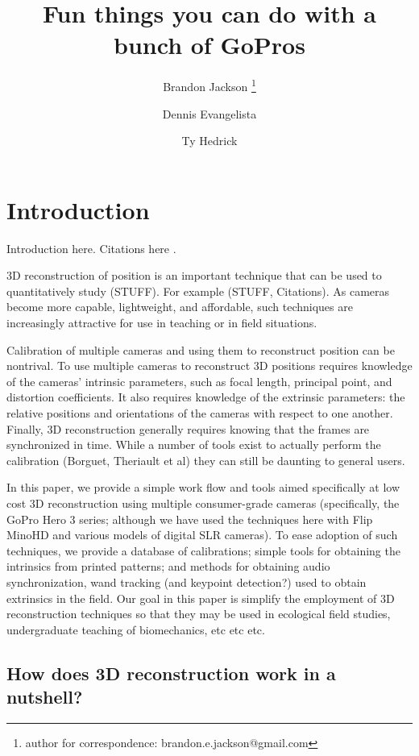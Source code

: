 \documentclass[fleqn,10pt]{wlpeerj}
\title{Fun things you can do with a bunch of GoPros}
\author[1,2]{Brandon Jackson \thanks{author for correspondence: brandon.e.jackson@gmail.com}}
\author[2]{Dennis Evangelista}
\author[2]{Ty Hedrick}
\affil[1]{Longwood College, Charlottesville, VA}
\affil[2]{University of North Carolina at Chapel Hill, NC 27599-3280, USA}
\begin{document}
\flushbottom
\maketitle
\thispagestyle{empty}

\modulolinenumbers[5]
\linenumbers

\section*{Introduction}

Introduction here. Citations here \citep{Theriault:2014, Bradski:2004}. 

3D reconstruction of position is an important technique that can be used to quantitatively study (STUFF).  For example (STUFF, Citations). As cameras become more capable, lightweight, and affordable, such techniques are increasingly attractive for use in teaching or in field situations.  

Calibration of multiple cameras and using them to reconstruct position can be nontrival.  To use multiple cameras to reconstruct 3D positions requires knowledge of the cameras' intrinsic parameters, such as focal length, principal point, and distortion coefficients.  It also requires knowledge of the extrinsic parameters: the relative positions and orientations of the cameras with respect to one another. Finally, 3D reconstruction generally requires knowing that the frames are synchronized in time.  While a number of tools exist to actually perform the calibration (Borguet, Theriault et al) they can still be daunting to general users.

In this paper, we provide a simple work flow and tools aimed specifically at low cost 3D reconstruction using multiple consumer-grade cameras (specifically, the GoPro Hero 3 series; although we have used the techniques here with Flip MinoHD and various models of digital SLR cameras).  To ease adoption of such techniques, we provide a database of calibrations; simple tools for obtaining the intrinsics from printed patterns; and methods for obtaining audio synchronization, wand tracking (and keypoint detection?) used to obtain extrinsics in the field. Our goal in this paper is simplify the employment of 3D reconstruction techniques so that they may be used in ecological field studies, undergraduate teaching of biomechanics, etc etc etc. 

\subsection*{How does 3D reconstruction work in a nutshell?}
\end{document}

